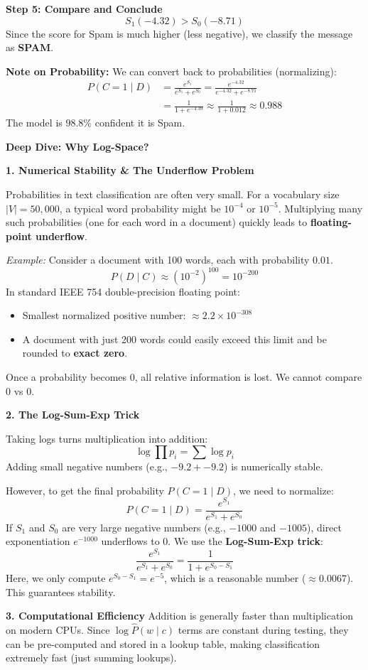 \documentclass[12pt]{article}
\begin{document}
\begin{solution}
\textbf{Step 5: Compare and Conclude}
\[
S_1 (-4.32) > S_0 (-8.71)
\]
Since the score for Spam is much higher (less negative), we classify the message as \textbf{SPAM}.

\textbf{Note on Probability:}
We can convert back to probabilities (normalizing):
\begin{align*}
P(C=1 \mid D) &= \frac{e^{S_1}}{e^{S_1} + e^{S_0}} = \frac{e^{-4.32}}{e^{-4.32} + e^{-8.71}} \\
&= \frac{1}{1 + e^{-4.39}} \approx \frac{1}{1 + 0.012} \approx 0.988
\end{align*}
The model is $98.8\%$ confident it is Spam.
\end{solution}

\begin{explanation}
\textbf{Deep Dive: Why Log-Space?}

\textbf{1. Numerical Stability \& The Underflow Problem}

Probabilities in text classification are often very small. For a vocabulary size $|V| = 50,000$, a typical word probability might be $10^{-4}$ or $10^{-5}$.
Multiplying many such probabilities (one for each word in a document) quickly leads to \textbf{floating-point underflow}.

\textit{Example:}
Consider a document with 100 words, each with probability $0.01$.
\[
P(D \mid C) \approx (10^{-2})^{100} = 10^{-200}
\]
In standard IEEE 754 double-precision floating point:
\begin{itemize}
    \item Smallest normalized positive number: $\approx 2.2 \times 10^{-308}$
    \item A document with just 200 words could easily exceed this limit and be rounded to \textbf{exact zero}.
\end{itemize}

Once a probability becomes 0, all relative information is lost. We cannot compare $0$ vs $0$.

\textbf{2. The Log-Sum-Exp Trick}

Taking logs turns multiplication into addition:
\[
\log \prod p_i = \sum \log p_i
\]
Adding small negative numbers (e.g., $-9.2 + -9.2$) is numerically stable.

However, to get the final probability $P(C=1 \mid D)$, we need to normalize:
\[
P(C=1 \mid D) = \frac{e^{S_1}}{e^{S_1} + e^{S_0}}
\]
If $S_1$ and $S_0$ are very large negative numbers (e.g., $-1000$ and $-1005$), direct exponentiation $e^{-1000}$ underflows to 0.
We use the \textbf{Log-Sum-Exp trick}:
\[
\frac{e^{S_1}}{e^{S_1} + e^{S_0}} = \frac{1}{1 + e^{S_0 - S_1}}
\]
Here, we only compute $e^{S_0 - S_1} = e^{-5}$, which is a reasonable number ($\approx 0.0067$). This guarantees stability.

\textbf{3. Computational Efficiency}
Addition is generally faster than multiplication on modern CPUs. Since $\log \hat{P}(w \mid c)$ terms are constant during testing, they can be pre-computed and stored in a lookup table, making classification extremely fast (just summing lookups).
\end{explanation}
\end{document}
